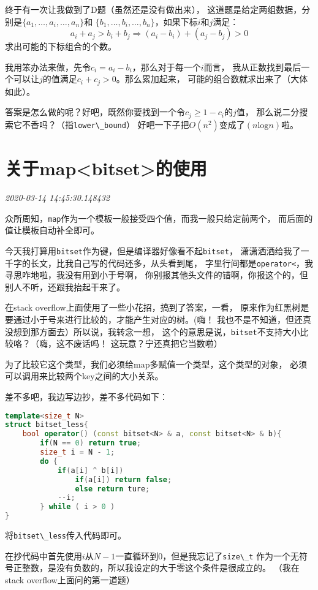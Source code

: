 \documentclass{peterlitsdoc}
\newcommand{\timetx}[1]
    {\par\noindent\emph{\pltgray\small #1}\vspace{2em}}
\newcommand{\vb}{\verb}
\begin{document}
终于有一次让我做到了D题（虽然还是没有做出来），
这道题是给定两组数据，分别是$\{a_1,\ldots,a_i,\ldots,a_n\}$和
$\{b_1,\ldots,b_i,\ldots,b_n\}$，如果下标$i$和$j$满足：
$$a_i+a_j>b_i+b_j\Rightarrow (a_i-b_i)+(a_j-b_j)>0$$
求出可能的下标组合的个数。

我用笨办法来做，先令$c_i=a_i-b_i$，那么对于每一个$i$而言，
我从正数找到最后一个可以让$j$的值满足$c_i+c_j>0$。那么累加起来，
可能的组合数就求出来了（大体如此）。

答案是怎么做的呢？好吧，既然你要找到一个令$c_j\ge 1-c_i$的$j$值，
那么说二分搜索它不香吗？（指\vb|lower\_bound|）
好吧一下子把$O(n^2)$变成了$(n\text{log}n)$啦。


\section{关于map<bitset>的使用}\timetx{2020-03-14 14:45:30.148432}

众所周知，\vb|map|作为一个模板一般接受四个值，而我一般只给定前两个，
而后面的值让模板自动补全即可。

今天我打算用\vb|bitset|作为键，但是编译器好像看不起\vb|bitset|，
潇潇洒洒给我了一千字的长文，比我自己写的代码还多，从头看到尾，
字里行间都是\vb|operator<|，我寻思咋地啦，我没有用到小于号啊，
你别报其他头文件的错啊，你报这个的，但别人不听，还跟我抬起干来了。

在stack overflow上面使用了一些小花招，搞到了答案，一看，
原来作为红黑树是要通过小于号来进行比较的，才能产生对应的树。(嗨！
我也不是不知道，但还真没想到那方面去）所以说，我转念一想，
这个的意思是说，\vb|bitset|不支持大小比较咯？（嗨，这不废话吗！
这玩意？宁还真把它当数啦）

为了比较它这个类型，我们必须给map多赋值一个类型，这个类型的对象，
必须可以调用来比较两个key之间的大小关系。

差不多吧，我边写边抄，差不多代码如下：
\begin{lstlisting}[language=C++]
template<size_t N>
struct bitset_less{
    bool operator() (const bitset<N> & a, const bitset<N> & b){
        if(N == 0) return true;
        size_t i = N - 1;
        do {
            if(a[i] ^ b[i])
                if(a[i]) return false;
                else return ture;
            --i;
        } while ( i > 0 )
}
\end{lstlisting}

将\vb|bitset\_less|传入代码即可。

在抄代码中首先使用$i$从$N-1$一直循环到$0$，但是我忘记了\vb|size\_t|
作为一个无符号正整数，是没有负数的，所以我设定的大于零这个条件是很成立的。
（我在stack overflow上面问的第一道题）
\end{document}
